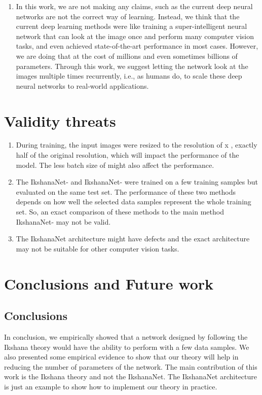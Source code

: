 \documentclass{article}
\begin{document}
\begin{enumerate}
\item In this work, we are not making any claims, such as the current deep neural networks are not the correct way of learning. Instead, we think that the current deep learning methods were like training a super-intelligent neural network that can look at the image once and perform many computer vision tasks, and even achieved state-of-the-art performance in most cases. However, we are doing that at the cost of millions and even sometimes billions of parameters. Through this work, we suggest letting the network look at the images multiple times recurrently, i.e., as humans do, to scale these deep neural networks to real-world applications.
\end{enumerate}
\section{Validity threats}
\begin{enumerate}
    \item During training, the input images were resized to the resolution of  x , exactly half of the original resolution, which will impact the performance of the model. The less batch size of  might also affect the performance.
    \item The IkshanaNet- and IkshanaNet- were trained on a few training samples but evaluated on the same test set.  The performance of these two methods depends on how well the selected data samples represent the whole training set. So, an exact comparison of these methods to the main method IkshanaNet- may not be valid.
    \item The IkshanaNet architecture might have defects and the exact architecture may not be suitable for other computer vision tasks.
\end{enumerate}

\section{Conclusions and Future work}
\subsection{Conclusions}
In conclusion, we empirically showed that a network designed by following the Ikshana theory would have the ability to perform with a few data samples. We also presented some empirical evidence to show that our theory will help in reducing the number of parameters of the network. The main contribution of this work is the Ikshana theory and not the IkshanaNet. The IkshanaNet architecture is just an example to show how to implement our theory in practice. 
\end{document}
